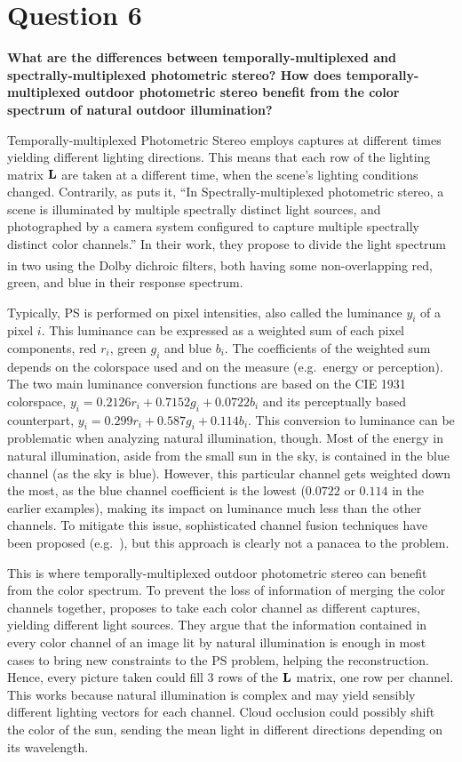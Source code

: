 \documentclass{report}
\begin{document}
\section{Question 6}
\textbf{What are the differences between temporally-multiplexed and spectrally-multiplexed photometric stereo? How does temporally-multiplexed outdoor photometric stereo benefit from the color spectrum of natural outdoor illumination?}

Temporally-multiplexed Photometric Stereo employs captures at different times yielding different lighting directions. This means that each row of the lighting matrix $\mathbf{L}$ are taken at a different time, when the scene's lighting conditions changed. Contrarily, as \cite{Fyffe2011} puts it, ``In Spectrally-multiplexed photometric stereo, a scene is illuminated by multiple spectrally distinct light sources, and photographed by a camera system configured to capture multiple spectrally distinct color channels.'' In their work, they propose to divide the light spectrum in two using the Dolby\textsuperscript{\textregistered} dichroic filters, both having some non-overlapping red, green, and blue in their response spectrum.

Typically, PS is performed on pixel intensities, also called the luminance $y_i$ of a pixel $i$. This luminance can be expressed as a weighted sum of each pixel components, red $r_i$, green $g_i$ and blue $b_i$. The coefficients of the weighted sum depends on the colorspace used and on the measure (e.g.\ energy or perception). The two main luminance conversion functions are based on the CIE 1931 colorspace, $y_i = 0.2126r_i + 0.7152g_i + 0.0722b_i$ and its perceptually based counterpart, $y_i = 0.299r_i + 0.587g_i + 0.114b_i$. This conversion to luminance can be problematic when analyzing natural illumination, though. Most of the energy in natural illumination, aside from the small sun in the sky, is contained in the blue channel (as the sky is blue). However, this particular channel gets weighted down the most, as the blue channel coefficient is the lowest ($0.0722$ or $0.114$ in the earlier examples), making its impact on luminance much less than the other channels. To mitigate this issue, sophisticated channel fusion techniques have been proposed (e.g.\ \cite{jung-cvpr-15}), but this approach is clearly not a panacea to the problem.

This is where temporally-multiplexed outdoor photometric stereo can benefit from the color spectrum. To prevent the loss of information of merging the color channels together, \cite{johnson-cvpr-11} proposes to take each color channel as different captures, yielding different light sources. They argue that the information contained in every color channel of an image lit by natural illumination is enough in most cases to bring new constraints to the PS problem, helping the reconstruction. Hence, every picture taken could fill 3 rows of the $\mathbf{L}$ matrix, one row per channel. This works because natural illumination is complex and may yield sensibly different lighting vectors for each channel. Cloud occlusion could possibly shift the color of the sun, sending the mean light in different directions depending on its wavelength.
\end{document}
